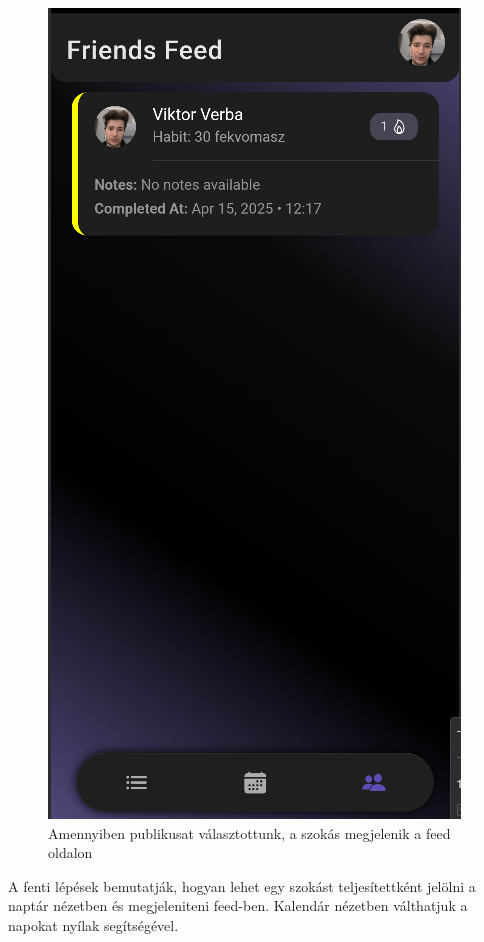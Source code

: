 \documentclass[12pt]{report}
\begin{document}
\begin{figure}[H]
\begin{minipage}[b]{0.3\textwidth}
        \includegraphics[width=\linewidth]{src/habitdone3.png}
        Amennyiben publikusat választottunk, a szokás megjelenik a feed oldalon
    \end{minipage}

\end{figure}
  A fenti lépések bemutatják, hogyan lehet egy szokást teljesítettként jelölni a naptár nézetben és megjeleniteni feed-ben. Kalendár nézetben válthatjuk a napokat nyílak segítségével. 
\end{document}
